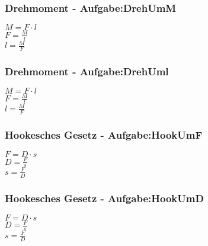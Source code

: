 \subsubsection{Drehmoment - Aufgabe:DrehUmM} 
\begin{minipage}{0.45\textwidth} 
$ M = F\cdot l $\\ 
$ F = \frac{M}{l} $\\ 
$ l = \frac{M}{F} $\\ 
\end{minipage} 
\begin{minipage}{0.45\textwidth} 
 
\end{minipage} 
\subsubsection{Drehmoment - Aufgabe:DrehUml} 
\begin{minipage}{0.45\textwidth} 
$ M = F\cdot l $\\ 
$ F = \frac{M}{l} $\\ 
$ l = \frac{M}{F} $\\ 
\end{minipage} 
\begin{minipage}{0.45\textwidth} 
 
\end{minipage} 
\subsubsection{Hookesches Gesetz - Aufgabe:HookUmF} 
\begin{minipage}{0.45\textwidth} 
$ F = D\cdot s $\\ 
$ D = \frac{F}{s} $\\ 
$ s = \frac{F}{D} $\\ 
\end{minipage} 
\begin{minipage}{0.45\textwidth} 
 
\end{minipage} 
\subsubsection{Hookesches Gesetz - Aufgabe:HookUmD} 
\begin{minipage}{0.45\textwidth} 
$ F = D\cdot s $\\ 
$ D = \frac{F}{s} $\\ 
$ s = \frac{F}{D} $\\ 
\end{minipage} 
\begin{minipage}{0.45\textwidth} 
 
\end{minipage} 
